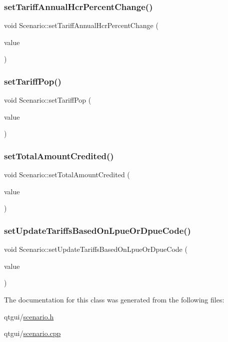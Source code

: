 \subsubsection{\texorpdfstring{setTariffAnnualHcrPercentChange()}{setTariffAnnualHcrPercentChange()}}
{\footnotesize\ttfamily void Scenario\+::set\+Tariff\+Annual\+Hcr\+Percent\+Change (\begin{DoxyParamCaption}\item[{double}]{value }\end{DoxyParamCaption})}

\mbox{\label{class_scenario_a10049509906d39cf8e7b8894c9eff7a9}} 
\subsubsection{\texorpdfstring{setTariffPop()}{setTariffPop()}}
{\footnotesize\ttfamily void Scenario\+::set\+Tariff\+Pop (\begin{DoxyParamCaption}\item[{const Q\+String\+List \&}]{value }\end{DoxyParamCaption})}

\mbox{\label{class_scenario_aa4a29bec8fc7503ede9db6b528ab5824}} 
\subsubsection{\texorpdfstring{setTotalAmountCredited()}{setTotalAmountCredited()}}
{\footnotesize\ttfamily void Scenario\+::set\+Total\+Amount\+Credited (\begin{DoxyParamCaption}\item[{int}]{value }\end{DoxyParamCaption})}

\mbox{\label{class_scenario_ad87cb95d62609f48ff4a124e1c057fdb}} 
\subsubsection{\texorpdfstring{setUpdateTariffsBasedOnLpueOrDpueCode()}{setUpdateTariffsBasedOnLpueOrDpueCode()}}
{\footnotesize\ttfamily void Scenario\+::set\+Update\+Tariffs\+Based\+On\+Lpue\+Or\+Dpue\+Code (\begin{DoxyParamCaption}\item[{int}]{value }\end{DoxyParamCaption})}



The documentation for this class was generated from the following files\+:\begin{DoxyCompactItemize}
\item 
qtgui/\mbox{\hyperlink{scenario_8h}{scenario.\+h}}\item 
qtgui/\mbox{\hyperlink{scenario_8cpp}{scenario.\+cpp}}\end{DoxyCompactItemize}
